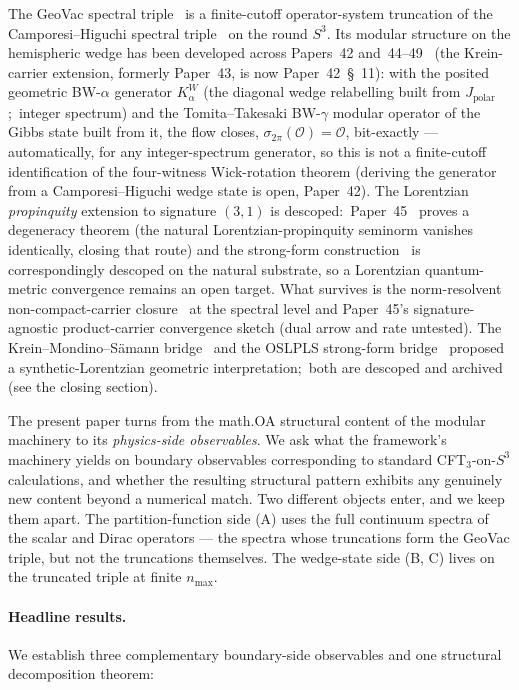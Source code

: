 \documentclass[11pt,a4paper]{article}
\theoremstyle{plain}
\theoremstyle{definition}
\newcommand{\nmax}{n_{\max}}
\newcommand{\sthree}{S^{3}}
\newcommand{\Op}{\mathcal{O}}
\newcommand{\Kalpha}{K_{\alpha}^{W}}
\begin{document}
The GeoVac spectral triple~\cite{paper7, paper32} is a finite-cutoff
operator-system truncation of the Camporesi--Higuchi spectral
triple~\cite{camporesi_higuchi1996} on the round $\sthree$. Its
modular structure on the hemispheric wedge has been developed across
Papers~42 and~44--49~\cite{paper42, paper44, paper45, paper46,
paper47, paper48, paper49} (the Krein-carrier extension, formerly
Paper~43, is now Paper~42~\S~11): with the posited geometric BW-$\alpha$
generator $\Kalpha$ (the diagonal wedge relabelling built from
$J_{\mathrm{polar}}$;\ integer spectrum) and the
Tomita--Takesaki BW-$\gamma$ modular operator of the Gibbs state built
from it, the flow closes, $\sigma_{2\pi}(\Op) = \Op$, bit-exactly ---
automatically, for any integer-spectrum generator, so this is not a
finite-cutoff identification of the four-witness Wick-rotation theorem
(deriving the generator from a
Camporesi--Higuchi wedge state is open, Paper~42). The Lorentzian
\emph{propinquity} extension to signature $(3,1)$ is descoped:\
Paper~45~\cite{paper45} proves a degeneracy theorem (the natural
Lorentzian-propinquity seminorm vanishes identically, closing that
route) and the strong-form construction~\cite{paper46} is
correspondingly descoped on the natural substrate, so a Lorentzian
quantum-metric convergence remains an open target. What survives is
the norm-resolvent non-compact-carrier closure~\cite{paper47} at the
spectral level and Paper~45's signature-agnostic product-carrier
convergence sketch (dual arrow and rate untested).
The Krein--Mondino--S\"amann bridge~\cite{paper48} and the
OSLPLS strong-form bridge~\cite{paper49} proposed a synthetic-Lorentzian
geometric interpretation;\ both are descoped and archived (see the
closing section).

The present paper turns from the math.OA structural content of the
modular machinery to its \emph{physics-side observables}. We ask
what the framework's machinery yields on boundary observables
corresponding to standard CFT$_{3}$-on-$\sthree$ calculations, and
whether the resulting structural pattern exhibits any genuinely new
content beyond a numerical match. Two different objects enter, and we
keep them apart. The partition-function side (A) uses the full
continuum spectra of the scalar and Dirac operators --- the spectra
whose truncations form the GeoVac triple, but not the truncations
themselves. The wedge-state side (B, C) lives on the truncated triple
at finite $\nmax$.

\paragraph{Headline results.}
We establish three complementary boundary-side observables and one
structural decomposition theorem:
\end{document}
